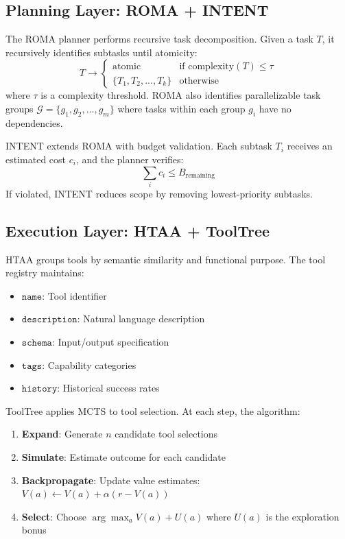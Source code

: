 \documentclass[11pt,a4paper]{article}
\newcommand{\tool}[1]{\texttt{#1}}
\begin{document}
\subsection{Planning Layer: ROMA + INTENT}

The ROMA planner performs recursive task decomposition. Given a task $T$, it recursively identifies subtasks until atomicity:
\begin{equation}
T \rightarrow \begin{cases}
\text{atomic} & \text{if } \text{complexity}(T) \leq \tau \\
\{T_1, T_2, ..., T_k\} & \text{otherwise}
\end{cases}
\end{equation}
where $\tau$ is a complexity threshold. ROMA also identifies parallelizable task groups $\mathcal{G} = \{g_1, g_2, ..., g_m\}$ where tasks within each group $g_i$ have no dependencies.

INTENT extends ROMA with budget validation. Each subtask $T_i$ receives an estimated cost $c_i$, and the planner verifies:
\begin{equation}
\sum_{i} c_i \leq B_{\text{remaining}}
\end{equation}
If violated, INTENT reduces scope by removing lowest-priority subtasks.

\subsection{Execution Layer: HTAA + ToolTree}

HTAA groups tools by semantic similarity and functional purpose. The tool registry maintains:
\begin{itemize}
    \item $\tool{name}$: Tool identifier
    \item $\tool{description}$: Natural language description
    \item $\tool{schema}$: Input/output specification
    \item $\tool{tags}$: Capability categories
    \item $\tool{history}$: Historical success rates
\end{itemize}

ToolTree applies MCTS to tool selection. At each step, the algorithm:
\begin{enumerate}
    \item \textbf{Expand}: Generate $n$ candidate tool selections
    \item \textbf{Simulate}: Estimate outcome for each candidate
    \item \textbf{Backpropagate}: Update value estimates: $V(a) \leftarrow V(a) + \alpha(r - V(a))$
    \item \textbf{Select}: Choose $\arg\max_a V(a) + U(a)$ where $U(a)$ is the exploration bonus
\end{enumerate}
\end{document}

